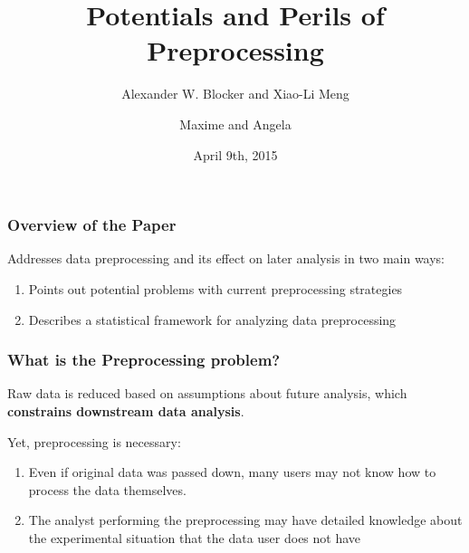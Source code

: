 \documentclass[10pt, compress]{beamer}
\title{Potentials and Perils of Preprocessing}
\subtitle{Alexander W. Blocker and Xiao-Li Meng}
\date{April 9th, 2015}
\author{Maxime and Angela}
\begin{document}
\maketitle

\begin{frame}[fragile]
    \frametitle{Overview of the Paper}
    
    Addresses data preprocessing and its effect on later analysis in two main ways:
    \begin{enumerate}
    \item Points out potential problems with current preprocessing strategies
    \item Describes a statistical framework for analyzing data preprocessing
    \end{enumerate}

\end{frame}

\begin{frame}[fragile]
    \frametitle{What is the Preprocessing problem?}

    Raw data is reduced based on assumptions about future analysis, which \textbf{constrains downstream data analysis}.
    
    Yet, preprocessing is necessary:

    \begin{enumerate}
    \item Even if original data was passed down, many users may not know how to process the data themselves. 
    \item The analyst performing the preprocessing may have detailed knowledge about the experimental situation that the data user does not have
  \end{enumerate}
  
\end{frame}
\end{document}
